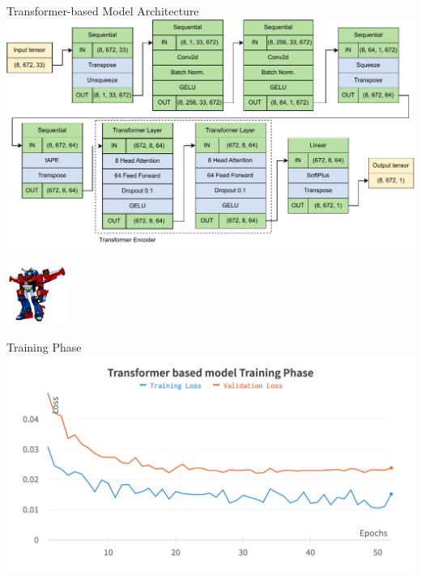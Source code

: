 \begin{frame}{Transformer-based Model Architecture}
    \centering
    \vspace{.5cm}
    \includegraphics[width=\textwidth]{sections/4_models/imgs/trans/transformer.pdf}

    \hfill
    \vspace{-1cm}
    \includegraphics[width=2cm]{sections/4_models/imgs/trans/trans.png}
\end{frame}


  \begin{frame}{Training Phase}
    \centering
  \includegraphics[width=\textwidth]{sections/4_models/imgs/trans/gabtraining.png}
  \end{frame}

